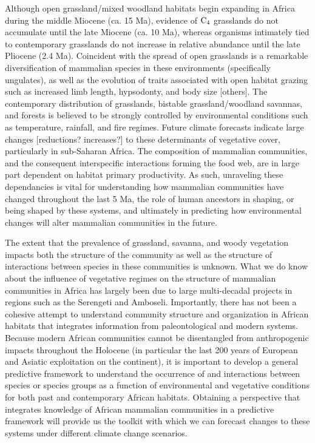 \documentclass[11pt]{article}
\begin{document}
Although open grassland/mixed woodland habitats begin expanding in Africa during the middle Miocene (ca. 15 Ma), evidence of $\rm C_4$ grasslands do not accumulate until the late Miocene (ca. 10 Ma), whereas organisms intimately tied to contemporary grasslands do not increase in relative abundance until the late Pliocene (2.4 Ma). 
Coincident with the spread of open grasslands is a remarkable diversification of mammalian species in these environments (specifically ungulates), as well as the evolution of traits associated with open habitat grazing such as increased limb length, hypsodonty, and body size [others].
The contemporary distribution of grasslands, bistable grassland/woodland savannas, and forests is believed to be strongly controlled by environmental conditions such as temperature, rainfall, and fire regimes.
Future climate forecasts indicate large changes [reductions? increases?] to these determinants of vegetative cover, particularly in sub-Saharan Africa.
The composition of mammalian communities, and the consequent interspecific interactions forming the food web, are in large part dependent on habitat primary productivity.
As such, unraveling these dependancies is vital for understanding how mammalian communities have changed throughout the last 5 Ma, the role of human ancestors in shaping, or being shaped by these systems, and ultimately in predicting how environmental changes will alter mammalian communities in the future.


The extent that the prevalence of grassland, savanna, and woody vegetation impacts both the structure of the community as well as the structure of interactions between species in these communities is unknown.
What we do know about the influence of vegetative regimes on the structure of mammalian communities in Africa has largely been due to large multi-decadal projects in regions such as the Serengeti and Amboseli.
Importantly, there has not been a cohesive attempt to understand community structure and organization in African habitats that integrates information from paleontological and modern systems.
Because modern African communities cannot be disentangled from anthropogenic impacts throughout the Holocene (in particular the last 200 years of European and Asiatic exploitation on the continent), it is important to develop a general predictive framework to understand the occurrence of and interactions between species or species groups as a function of environmental and vegetative conditions for both past and contemporary African habitats.
Obtaining a perspective that integrates knowledge of African mammalian communities in a predictive framework will provide us the toolkit with which we can forecast changes to these systems under different climate change scenarios.
 
\end{document}
